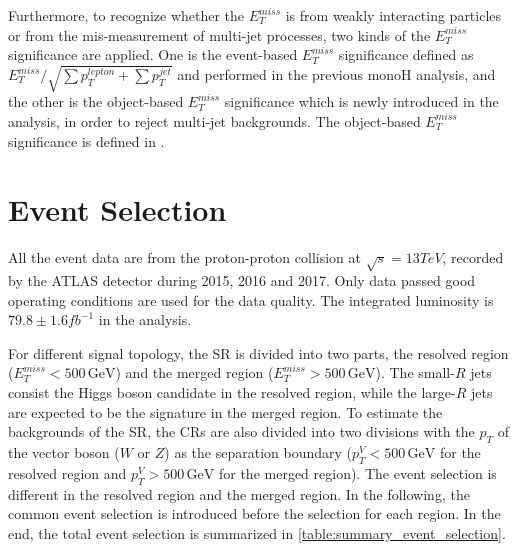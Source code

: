 \documentclass[class=NTHU_thesis, crop=false]{standalone}
\begin{document}
Furthermore, to recognize whether the $E^{miss}_T$ is from weakly interacting particles or from the mis-measurement of multi-jet processes, two kinds of the $E^{miss}_T$ significance are applied. One is the event-based $E^{miss}_T$ significance defined as $E^{miss}_T/\sqrt{{\sum}p^{lepton}_T+{\sum}p^{jet}_T}$ and performed in the previous monoH analysis\cite{Meehan:2225941}, and the other is the object-based $E^{miss}_T$ significance which is newly introduced in the analysis, in order to reject multi-jet backgrounds. The object-based $E^{miss}_T$ significance is defined in \cite{ATLAS-CONF-2018-038}.

\section{Event Selection}
All the event data are from the proton-proton collision at $\sqrt{s} = 13 TeV$, recorded by the ATLAS detector during 2015, 2016 and 2017. Only data passed good operating conditions are used for the data quality. The integrated luminosity is $79.8 \pm 1.6 fb^{-1}$ in the analysis.

For different signal topology, the SR is divided into two parts, the resolved region ($E^{miss}_T < 500\, \mathrm{GeV}$) and the merged region ($E^{miss}_T > 500\, \mathrm{GeV}$). The small-$R$ jets consist the Higgs boson candidate in the resolved region, while the large-$R$ jets are expected to be the signature in the merged region. To estimate the backgrounds of the SR, the CRs are also divided into two divisions with the $p_T$ of the vector boson ($W$ or $Z$) as the separation boundary ($p^V_T < 500\, \mathrm{GeV}$ for the resolved region and $p^V_T > 500\, \mathrm{GeV}$ for the merged region). The event selection is different in the resolved region and the merged region. In the following, the common event selection is introduced before the selection for each region. In the end, the total event selection is summarized in \cref{table:summary_event_selection}.
\end{document}
